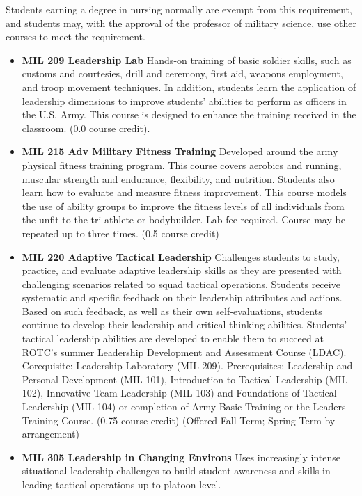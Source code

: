 \documentclass[
  letterpaper,
]{scrbook}
\providecommand{\tightlist}{%
  \setlength{\itemsep}{0pt}\setlength{\parskip}{0pt}}
\begin{document}
Students earning a degree in nursing normally are exempt from this
requirement, and students may, with the approval of the professor of
military science, use other courses to meet the requirement.

\begin{itemize}
\tightlist
\item
  \textbf{MIL 209 Leadership Lab} Hands-on training of basic soldier
  skills, such as customs and courtesies, drill and ceremony, first aid,
  weapons employment, and troop movement techniques. In addition,
  students learn the application of leadership dimensions to improve
  students' abilities to perform as officers in the U.S. Army. This
  course is designed to enhance the training received in the classroom.
  (0.0 course credit).
\item
  \textbf{MIL 215 Adv Military Fitness Training} Developed around the
  army physical fitness training program. This course covers aerobics
  and running, muscular strength and endurance, flexibility, and
  nutrition. Students also learn how to evaluate and measure fitness
  improvement. This course models the use of ability groups to improve
  the fitness levels of all individuals from the unfit to the
  tri-athlete or bodybuilder. Lab fee required. Course may be repeated
  up to three times. (0.5 course credit)
\item
  \textbf{MIL 220 Adaptive Tactical Leadership} Challenges students to
  study, practice, and evaluate adaptive leadership skills as they are
  presented with challenging scenarios related to squad tactical
  operations. Students receive systematic and specific feedback on their
  leadership attributes and actions. Based on such feedback, as well as
  their own self-evaluations, students continue to develop their
  leadership and critical thinking abilities. Students' tactical
  leadership abilities are developed to enable them to succeed at ROTC's
  summer Leadership Development and Assessment Course (LDAC).
  Corequisite: Leadership Laboratory (MIL-209). Prerequisites:
  Leadership and Personal Development (MIL-101), Introduction to
  Tactical Leadership (MIL-102), Innovative Team Leadership (MIL-103)
  and Foundations of Tactical Leadership (MIL-104) or completion of Army
  Basic Training or the Leaders Training Course. (0.75 course credit)
  (Offered Fall Term; Spring Term by arrangement)
\item
  \textbf{MIL 305 Leadership in Changing Environs} Uses increasingly
  intense situational leadership challenges to build student awareness
  and skills in leading tactical operations up to platoon level.

\end{itemize}
\end{document}
